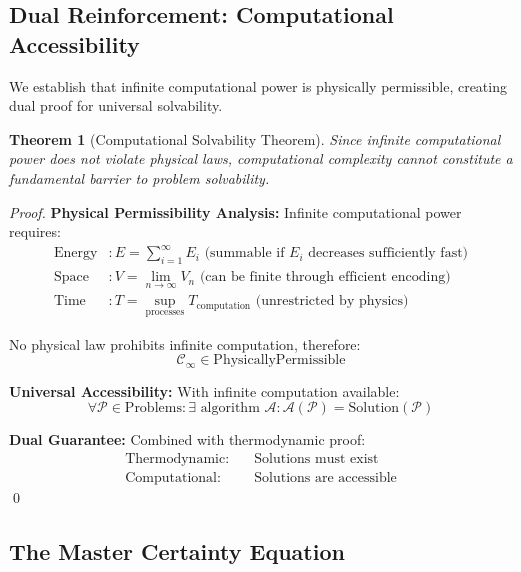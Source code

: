 \documentclass[12pt,a4paper]{article}
\newtheorem{theorem}{Theorem}[section]
\begin{document}
\subsection{Dual Reinforcement: Computational Accessibility}

We establish that infinite computational power is physically permissible, creating dual proof for universal solvability.

\begin{theorem}[Computational Solvability Theorem]
Since infinite computational power does not violate physical laws, computational complexity cannot constitute a fundamental barrier to problem solvability.
\end{theorem}

\begin{proof}
\textbf{Physical Permissibility Analysis:}
Infinite computational power requires:
\begin{align}
\text{Energy} &: E = \sum_{i=1}^{\infty} E_i \text{ (summable if } E_i \text{ decreases sufficiently fast)} \\
\text{Space} &: V = \lim_{n \to \infty} V_n \text{ (can be finite through efficient encoding)} \\
\text{Time} &: T = \sup_{\text{processes}} T_{\text{computation}} \text{ (unrestricted by physics)}
\end{align}

No physical law prohibits infinite computation, therefore:
\begin{equation}
\mathcal{C}_{\infty} \in \text{PhysicallyPermissible}
\end{equation}

\textbf{Universal Accessibility:}
With infinite computation available:
\begin{equation}
\forall \mathcal{P} \in \text{Problems} : \exists \text{ algorithm } \mathcal{A} : \mathcal{A}(\mathcal{P}) = \text{Solution}(\mathcal{P})
\end{equation}

\textbf{Dual Guarantee:}
Combined with thermodynamic proof:
\begin{align}
\text{Thermodynamic:} & \quad \text{Solutions must exist} \\
\text{Computational:} & \quad \text{Solutions are accessible}
\end{align}
\qed
\end{proof}

\subsection{The Master Certainty Equation}
\end{document}
